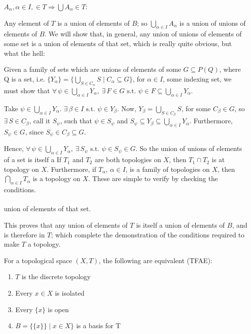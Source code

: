 \documentclass[12pt]{report}
\newcommand{\exercise}{ \noindent{\sc Exercise }\hspace{5pt} }
\newcommand{\claim}{ \noindent{\sc Claim }\hspace{5pt} }
\newcommand{\fall}{\forall\,}
\newcommand{\exst}{\exists\,}
\newcommand{\st}{\textrm{ s.t. }}
\newcommand{\unionover}[2]{\bigcup_{#1 \in #2 }}
\begin{document}
\noindent
$A_{\alpha}, \alpha \in I, \in T \Rightarrow \bigcup A_{\alpha} \in T $:

Any element of $T$ is a union of elements of $B$; so
$\unionover{\alpha}{I}A_{\alpha}$ is a union of unions of elements of $B$. We 
will show that, in general, 
any union of unions of elements of some set is a union of elements
of that set, which is really quite obvious, but what the hell:

Given a family of sets which are unions of elements of some 
$G \subseteq P(Q)$, where Q is a set, i.e.
$\{Y_\alpha\} = \{\unionover{S}{C_\alpha}S \mid C_\alpha \subseteq G\}$, 
for $\alpha \in I$, some indexing set, we must show that 
$\fall \psi \in \unionover{\alpha}{I}Y_\alpha,\ \exst F \in G \st \psi \in F
\subseteq \unionover{\alpha}{I}Y_\alpha$.

Take $\psi \in \unionover{\alpha}{I}Y_\alpha$. 
$\exst \beta \in I \st \psi \in Y_{\beta}$. Now, 
$Y_{\beta} = \unionover{S}{C_\beta}S$, for some
$C_\beta \in G$, so $\exst S \in C_\beta$, call it $S_\psi$, such that 
$\psi \in S_\psi$ and $S_\psi \subseteq Y_\beta \subseteq
\unionover{\alpha}{I}Y_\alpha$. Furthermore, $S_\psi \in G$, since $S_\psi \in
C_\beta \subseteq G$.

Hence, $\fall \psi \in \unionover{\alpha}{I}Y_\alpha,\ \exst S_\psi \st \psi
\in S_\psi \in G$. So the union of unions of elements of a set is itself a
\claim If $T_1$ and $T_2$ are both topologies on $X$, then $T_1 \cap T_2$ is
at topology on $X$. Furthermore, if $T_\alpha$, $\alpha \in I$, is a family of
topologies on $X$, then $\bigcap_{\alpha \in I}T_{\alpha}$ is a topology on
$X$. These are simple to verify by checking the conditions.\\
\\
union of elements of that set. 

This proves that any union of elements of $T$ is itself a union of elements of
$B$, and is therefore in $T$; which complete the demonstration of the
conditions required to make $T$ a topology.

\exercise For a topological space $(X,T)$, the following are equivalent
(TFAE):
\begin{enumerate}
\item $T$ is the discrete topology
\item Every $x \in X$ is isolated
\item Every $\{x\}$ is open
\item $B = \{ \{x\} \} \mid x \in X \}$ is a basis for T
\end{enumerate}
\end{document}
